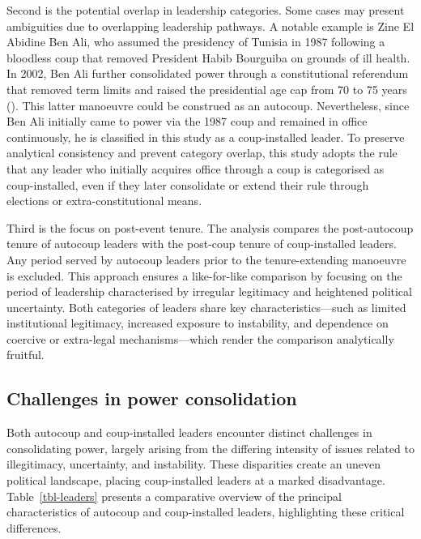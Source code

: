 \documentclass[
  12pt,
]{report}
\begin{document}
Second is the potential overlap in leadership categories. Some cases may
present ambiguities due to overlapping leadership pathways. A notable
example is Zine El Abidine Ben Ali, who assumed the presidency of
Tunisia in 1987 following a bloodless coup that removed President Habib
Bourguiba on grounds of ill health. In 2002, Ben Ali further
consolidated power through a constitutional referendum that removed term
limits and raised the presidential age cap from 70 to 75 years
(). This latter
manoeuvre could be construed as an autocoup. Nevertheless, since Ben Ali
initially came to power via the 1987 coup and remained in office
continuously, he is classified in this study as a coup-installed leader.
To preserve analytical consistency and prevent category overlap, this
study adopts the rule that any leader who initially acquires office
through a coup is categorised as coup-installed, even if they later
consolidate or extend their rule through elections or
extra-constitutional means.

Third is the focus on post-event tenure. The analysis compares the
post-autocoup tenure of autocoup leaders with the post-coup tenure of
coup-installed leaders. Any period served by autocoup leaders prior to
the tenure-extending manoeuvre is excluded. This approach ensures a
like-for-like comparison by focusing on the period of leadership
characterised by irregular legitimacy and heightened political
uncertainty. Both categories of leaders share key characteristics---such
as limited institutional legitimacy, increased exposure to instability,
and dependence on coercive or extra-legal mechanisms---which render the
comparison analytically fruitful.

\subsection*{Challenges in power
consolidation}\label{challenges-in-power-consolidation}

Both autocoup and coup-installed leaders encounter distinct challenges
in consolidating power, largely arising from the differing intensity of
issues related to illegitimacy, uncertainty, and instability. These
disparities create an uneven political landscape, placing coup-installed
leaders at a marked disadvantage. Table~\ref{tbl-leaders} presents a
comparative overview of the principal characteristics of autocoup and
coup-installed leaders, highlighting these critical differences.
\end{document}
